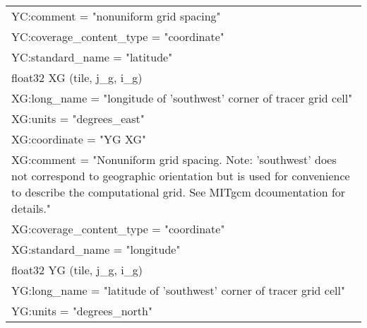 \begin{longtable}{|p{\textwidth}|}
\rowcolor{Apricot}\hspace{0.5cm}\hspace{0.5cm}YC:comment = "nonuniform grid spacing"\\
\rowcolor{Apricot}\hspace{0.5cm}\hspace{0.5cm}YC:coverage\_content\_type = "coordinate"\\
\rowcolor{Apricot}\hspace{0.5cm}\hspace{0.5cm}YC:standard\_name = "latitude"\\
\rowcolor{Apricot}\hspace{0.5cm}float32 XG (tile, j\_g, i\_g)\\
\rowcolor{Apricot}\hspace{0.5cm}\hspace{0.5cm}XG:long\_name = "longitude of 'southwest' corner of tracer grid cell"\\
\rowcolor{Apricot}\hspace{0.5cm}\hspace{0.5cm}XG:units = "degrees\_east"\\
\rowcolor{Apricot}\hspace{0.5cm}\hspace{0.5cm}XG:coordinate = "YG XG"\\
\rowcolor{Apricot}\hspace{0.5cm}\hspace{0.5cm}XG:comment = "Nonuniform grid spacing. Note: 'southwest' does not correspond to geographic orientation but is used for convenience to describe the computational grid. See MITgcm dcoumentation for details."\\
\rowcolor{Apricot}\hspace{0.5cm}\hspace{0.5cm}XG:coverage\_content\_type = "coordinate"\\
\rowcolor{Apricot}\hspace{0.5cm}\hspace{0.5cm}XG:standard\_name = "longitude"\\
\rowcolor{Apricot}\hspace{0.5cm}float32 YG (tile, j\_g, i\_g)\\
\rowcolor{Apricot}\hspace{0.5cm}\hspace{0.5cm}YG:long\_name = "latitude of 'southwest' corner of tracer grid cell"\\
\rowcolor{Apricot}\hspace{0.5cm}\hspace{0.5cm}YG:units = "degrees\_north"\\

\end{longtable}
